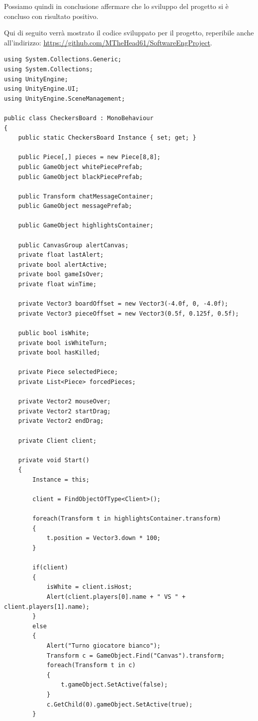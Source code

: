 \documentclass[12pt]{article}
\begin{document}
Possiamo quindi in conclusione affermare che lo sviluppo del progetto si è concluso con risultato positivo.

Qui di seguito verrà mostrato il codice sviluppato per il progetto, reperibile anche all'indirizzo: \url{https://github.com/MTheHead61/SoftwareEngProject}.

\begin{lstlisting}[language={[Sharp]C}, caption={CheckersBoard.cs}, label={CheckersBoardScript}]
using System.Collections.Generic;
using System.Collections;
using UnityEngine;
using UnityEngine.UI;
using UnityEngine.SceneManagement;

public class CheckersBoard : MonoBehaviour
{
	public static CheckersBoard Instance { set; get; }
	
	public Piece[,] pieces = new Piece[8,8];
	public GameObject whitePiecePrefab;
	public GameObject blackPiecePrefab;
	
	public Transform chatMessageContainer;
	public GameObject messagePrefab;
	
	public GameObject highlightsContainer;

	public CanvasGroup alertCanvas;
	private float lastAlert;
	private bool alertActive;
	private bool gameIsOver;
	private float winTime;

	private Vector3 boardOffset = new Vector3(-4.0f, 0, -4.0f);
	private Vector3 pieceOffset = new Vector3(0.5f, 0.125f, 0.5f);

	public bool isWhite;
	private bool isWhiteTurn;
	private bool hasKilled;

	private Piece selectedPiece;
	private List<Piece> forcedPieces;

	private Vector2 mouseOver;
	private Vector2 startDrag;
	private Vector2 endDrag;
	
	private Client client;

	private void Start()
	{	
		Instance = this;
		
		client = FindObjectOfType<Client>();
		
		foreach(Transform t in highlightsContainer.transform)
		{
			t.position = Vector3.down * 100;
		}
		
		if(client)
		{
			isWhite = client.isHost;
			Alert(client.players[0].name + " VS " + client.players[1].name);
		}
		else
		{
			Alert("Turno giocatore bianco");
			Transform c = GameObject.Find("Canvas").transform;
			foreach(Transform t in c)
			{
				t.gameObject.SetActive(false);
			}
			c.GetChild(0).gameObject.SetActive(true);
		}
		

\end{lstlisting}
\end{document}
